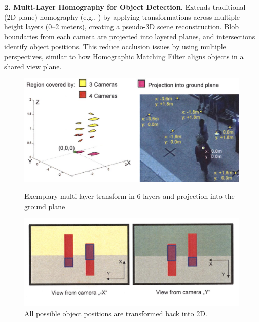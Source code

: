 \documentclass[12pt, a4paper]{article}
\begin{document}
\textbf{2. Multi-Layer Homography for Object Detection}. Extends traditional (2D plane) homography (e.g., \cite{Homography-UAV}) by applying transformations across multiple height layers (0–2 meters), creating a pseudo-3D scene reconstruction. Blob boundaries from each camera are projected into layered planes, and intersections identify object positions. This reduce occlusion issues by using multiple perspectives, similar to how \cite{Homography-UAV} Homographic Matching Filter aligns objects in a shared view plane.


\begin{figure}[h]
    \centering
    \begin{minipage}{0.5\textwidth}
        \centering
        \includegraphics[width=\linewidth]{pictures/multi_layer_projections.jpeg}
        \caption{Exemplary multi layer transform in 6 layers and projection into the ground plane}
        \label{fig:multi_layer_projections}
    \end{minipage}
    \hfill
    \begin{minipage}{0.45\textwidth}
        \centering
        \includegraphics[width=\linewidth]{pictures/multi_layer_views.jpeg}
        \caption{All possible object positions are transformed back into 2D.}
        \label{fig:multi_layer_views}
    \end{minipage}
\end{figure}
\end{document}

